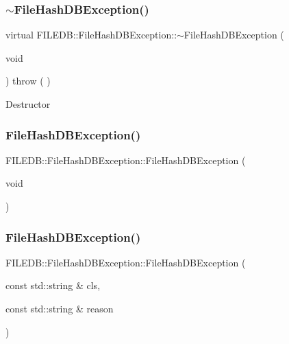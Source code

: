 \subsubsection{\texorpdfstring{$\sim$FileHashDBException()}{~FileHashDBException()}\hspace{0.1cm}{\footnotesize\ttfamily [2/3]}}
{\footnotesize\ttfamily virtual F\+I\+L\+E\+D\+B\+::\+File\+Hash\+D\+B\+Exception\+::$\sim$\+File\+Hash\+D\+B\+Exception (\begin{DoxyParamCaption}\item[{void}]{ }\end{DoxyParamCaption}) throw ( ) \hspace{0.3cm}{\ttfamily [virtual]}}

Destructor \mbox{\label{classFILEDB_1_1FileHashDBException_a7cbe99c797d9edf2d2e123d3aacaba76}} 
\subsubsection{\texorpdfstring{FileHashDBException()}{FileHashDBException()}\hspace{0.1cm}{\footnotesize\ttfamily [6/9]}}
{\footnotesize\ttfamily F\+I\+L\+E\+D\+B\+::\+File\+Hash\+D\+B\+Exception\+::\+File\+Hash\+D\+B\+Exception (\begin{DoxyParamCaption}\item[{void}]{ }\end{DoxyParamCaption})\hspace{0.3cm}{\ttfamily [protected]}}

\mbox{\label{classFILEDB_1_1FileHashDBException_ae549056e12f10f0bb24e0875a70ec57b}} 
\subsubsection{\texorpdfstring{FileHashDBException()}{FileHashDBException()}\hspace{0.1cm}{\footnotesize\ttfamily [7/9]}}
{\footnotesize\ttfamily F\+I\+L\+E\+D\+B\+::\+File\+Hash\+D\+B\+Exception\+::\+File\+Hash\+D\+B\+Exception (\begin{DoxyParamCaption}\item[{const std\+::string \&}]{cls,  }\item[{const std\+::string \&}]{reason }\end{DoxyParamCaption})}

